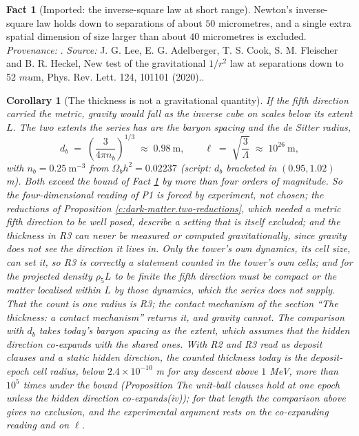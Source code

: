 \documentclass[11pt]{article}
\newtheorem{corollary}[theorem]{Corollary}
\theoremstyle{definition}
\newtheorem{fact}[theorem]{Fact}
\theoremstyle{plain}
\newcommand{\changedmark}[2]{\marginpar{\raggedright\scriptsize\color{#1}#2}}
\begin{document}
\begin{fact}[Imported: the inverse-square law at short range]\label{c:dark-matter.imported-inverse-square-law-short-range}
Newton's inverse-square law holds down to separations of about $50$ micrometres, and a single extra spatial dimension of size larger than about $40$ micrometres is excluded. \emph{Provenance:} \cite{Lee2020}.
\emph{Source:} J. G. Lee, E. G. Adelberger, T. S. Cook, S. M. Fleischer and B. R. Heckel, New test of the gravitational $1/r^2$ law at separations down to 52 $mu$m, Phys. Rev. Lett. 124, 101101 (2020)..
\end{fact}

\begin{corollary}[The thickness is not a gravitational quantity]\label{c:dark-matter.thickness-not-gravitational-quantity}
\changedmark{BurntOrange}{changed since the deposit}
If the fifth direction carried the metric, gravity would fall as the inverse cube on scales below its extent $L$. The two extents the series has are the baryon spacing and the de Sitter radius,
\[
d_{b} \;=\; \left(\frac{3}{4\pi n_{b}}\right)^{1/3} \;\approx\; 0.98\ \mathrm{m}, \qquad \ell \;=\; \sqrt{\frac{3}{\Lambda}} \;\approx\; 10^{26}\ \mathrm{m},
\]
with $n_{b} = 0.25\ \mathrm{m}^{-3}$ from $\Omega_{b}h^{2} = 0.02237$ (script: $d_{b}$ bracketed in $(0.95, 1.02)$ m). Both exceed the bound of Fact \ref{c:dark-matter.imported-inverse-square-law-short-range} by more than four orders of magnitude. So the four-dimensional reading of P1 is forced by experiment, not chosen; the reductions of Proposition \ref{c:dark-matter.two-reductions}, which needed a metric fifth direction to be well posed, describe a setting that is itself excluded; and the thickness in R3 can never be measured or computed gravitationally, since gravity does not see the direction it lives in. Only the tower's own dynamics, its cell size, can set it, so R3 is correctly a statement counted in the tower's own cells; and for the projected density $\rho_{5}L$ to be finite the fifth direction must be compact or the matter localised within $L$ by those dynamics, which the series does not supply. That the count is one radius is R3; the contact mechanism of the section ``The thickness: a contact mechanism'' returns it, and gravity cannot. The comparison with $d_{b}$ takes today's baryon spacing as the extent, which assumes that the hidden direction co-expands with the shared ones. With R2 and R3 read as deposit clauses and a static hidden direction, the counted thickness today is the deposit-epoch cell radius, below $2.4 \times 10^{-10}$ m for any descent above $1$ MeV, more than $10^{5}$ times under the bound (Proposition \emph{The unit-ball clauses hold at one epoch unless the hidden direction co-expands}(iv)); for that length the comparison above gives no exclusion, and the experimental argument rests on the co-expanding reading and on $\ell$.


\end{corollary}
\end{document}
